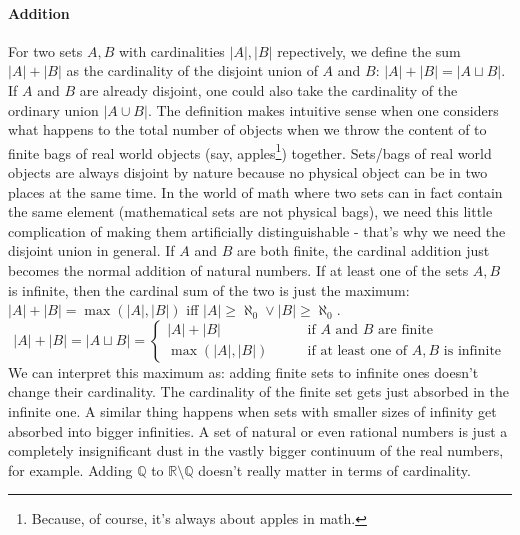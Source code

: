 
\paragraph{Addition} For two sets $A,B$ with cardinalities $|A|,|B|$ repectively, we define the sum $|A| + |B|$ as the cardinality of the disjoint union of $A$ and $B$: $|A| + |B| = |A \sqcup B|$. If $A$ and $B$ are already disjoint, one could also take the cardinality of the ordinary union $|A \cup B|$. The definition makes intuitive sense when one considers what happens to the total number of objects when we throw the content of to finite bags of real world objects (say, apples\footnote{Because, of course, it's always about apples in math.}) together. Sets/bags of real world objects are always disjoint by nature because no physical object can be in two places at the same time. In the world of math where two sets can in fact contain the same element (mathematical sets are not physical bags), we need this little complication of making them artificially distinguishable - that's why we need the disjoint union in general. If $A$ and $B$ are both finite, the cardinal addition just becomes the normal addition of natural numbers. If at least one of the sets $A, B$ is infinite, then the cardinal sum of the two is just the maximum: $|A| + |B| = \max(|A|, |B|)$ iff $|A| \geq \aleph_0 \vee |B| \geq \aleph_0$.
\begin{equation}
|A| + |B| = |A \sqcup B| =
\begin{cases}
|A| + |B|       \qquad &\text{if $A$ and $B$ are finite} \\
\max(|A|,|B|)   \qquad &\text{if at least one of $A, B$ is infinite}
\end{cases}
\end{equation}
We can interpret this maximum as: adding finite sets to infinite ones doesn't change their cardinality. The cardinality of the finite set gets just absorbed in the infinite one. A similar thing happens when sets with smaller sizes of infinity get absorbed into bigger infinities. A set of natural or even rational numbers is just a completely insignificant dust in the vastly bigger continuum of the real numbers, for example. Adding $\mathbb{Q}$ to $\mathbb{R} \setminus \mathbb{Q}$ doesn't really matter in terms of cardinality.


